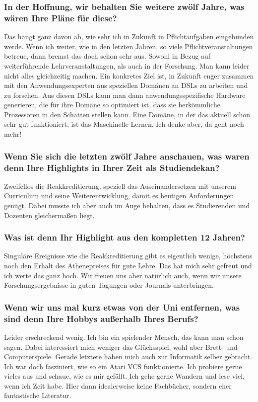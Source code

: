 {    \subsubsection{In der Hoffnung, wir behalten Sie weitere zwölf Jahre, was wären Ihre Pläne für diese?}
    Das hängt ganz davon ab, wie sehr ich in Zukunft in Pflichtaufgaben eingebunden werde. Wenn ich weiter, wie in den letzten Jahren, so viele Pflichtveranstaltungen betreue, dann bremst das doch schon sehr aus. Sowohl in Bezug auf weiterführende Lehrveranstaltungen, als auch in der Forschung. Man kann leider nicht alles gleichzeitig machen. Ein konkretes Ziel ist, in Zukunft enger zusammen mit den Anwendungsexperten aus speziellen Domänen an DSLs zu arbeiten und zu forschen. Aus diesen DSLs kann man dann anwendungsspezifische Hardware generieren, die für ihre Domäne so optimiert ist, dass sie herkömmliche Prozessoren in den Schatten stellen kann. Eine Domäne, in der das aktuell schon sehr gut funktioniert, ist das Maschinelle Lernen. Ich denke aber, da geht noch mehr!

    \subsubsection{Wenn Sie sich die letzten zwölf Jahre anschauen, was waren denn Ihre Highlights in Ihrer Zeit als Studiendekan?}
    Zweifellos die Reakkreditierung, speziell das Auseinandersetzen mit unserem Curriculum und seine Weiterentwicklung, damit es heutigen Anforderungen genügt. Dabei musste ich aber auch im Auge behalten, dass es Studierenden und Dozenten gleichermaßen liegt.

    \subsubsection{Was ist denn Ihr Highlight aus den kompletten 12 Jahren?}
    Singuläre Ereignisse wie die Reakkreditierung gibt es eigentlich wenige, höchstens noch den Erhalt des Athenepreises für gute Lehre. Das hat mich sehr gefreut und ich werte das ganz hoch. Wir freuen uns aber natürlich auch, wenn wir unsere Forschungsergebnisse in guten Tagungen oder Journals unterbringen.

    \subsubsection{Wenn wir uns mal kurz etwas von der Uni entfernen, was sind denn Ihre Hobbys außerhalb Ihres Berufs?}
    Leider erschreckend wenig. Ich bin ein spielender Mensch, das kann man schon sagen. Dabei interessiert mich weniger das Glücksspiel, wohl aber Brett- und Computerspiele. Gerade letztere haben mich auch zur Informatik selber gebracht. Ich war doch fasziniert, wie so ein Atari VCS funktionierte. Ich probiere gerne vieles aus und schaue, wie es mir gefällt. Ich gehe gerne Wandern und lese viel, wenn ich Zeit habe. Hier dann idealerweise keine Fachbücher, sondern eher fantastische Literatur.

}
